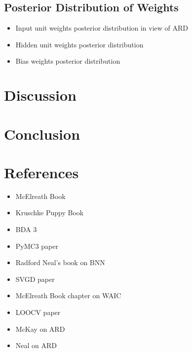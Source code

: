 \documentclass[10pt,a4paper]{article}
\begin{document}
		\subsection{Posterior Distribution of Weights}
			\begin{itemize}
				\item Input unit weights posterior distribution in view of ARD
				\item Hidden unit weights posterior distribution
				\item Bias weights posterior distribution
			\end{itemize}
	\newpage
	\section{Discussion}
	\newpage
	\section{Conclusion}
	\newpage
	\section{References}
		\begin{itemize}
			\item McElreath Book
			\item Kruschke Puppy Book
			\item BDA 3
			\item PyMC3 paper
			\item Radford Neal's book on BNN
			\item SVGD paper
			\item McElreath Book chapter on WAIC
			\item LOOCV paper
			\item McKay on ARD
			\item Neal on ARD
		\end{itemize}
\end{document}
